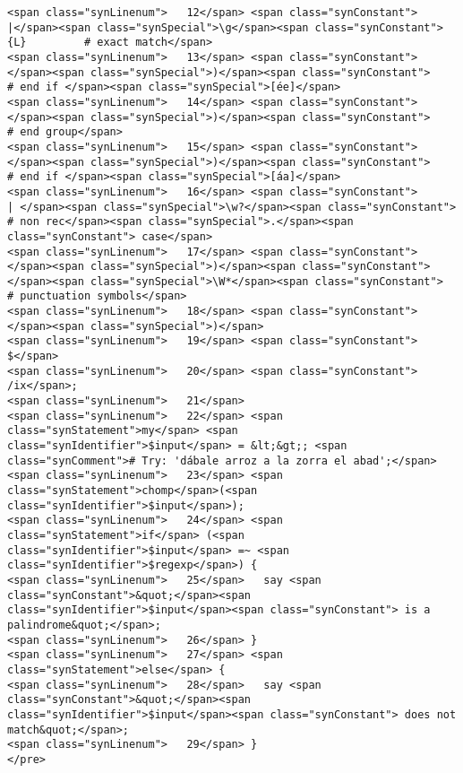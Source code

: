 \begin{verbatim}
<span class="synLinenum">   12</span> <span class="synConstant">                                            |</span><span class="synSpecial">\g</span><span class="synConstant">{L}         # exact match</span>
<span class="synLinenum">   13</span> <span class="synConstant">                                      </span><span class="synSpecial">)</span><span class="synConstant">                    # end if </span><span class="synSpecial">[ée]</span>
<span class="synLinenum">   14</span> <span class="synConstant">                                   </span><span class="synSpecial">)</span><span class="synConstant">                       # end group</span>
<span class="synLinenum">   15</span> <span class="synConstant">                            </span><span class="synSpecial">)</span><span class="synConstant">                              # end if </span><span class="synSpecial">[áa]</span>
<span class="synLinenum">   16</span> <span class="synConstant">                          | </span><span class="synSpecial">\w?</span><span class="synConstant">                            # non rec</span><span class="synSpecial">.</span><span class="synConstant"> case</span>
<span class="synLinenum">   17</span> <span class="synConstant">                      </span><span class="synSpecial">)</span><span class="synConstant"> </span><span class="synSpecial">\W*</span><span class="synConstant">                                # punctuation symbols</span>
<span class="synLinenum">   18</span> <span class="synConstant">                  </span><span class="synSpecial">)</span>
<span class="synLinenum">   19</span> <span class="synConstant">                $</span>
<span class="synLinenum">   20</span> <span class="synConstant">               /ix</span>;
<span class="synLinenum">   21</span> 
<span class="synLinenum">   22</span> <span class="synStatement">my</span> <span class="synIdentifier">$input</span> = &lt;&gt;; <span class="synComment"># Try: 'dábale arroz a la zorra el abad';</span>
<span class="synLinenum">   23</span> <span class="synStatement">chomp</span>(<span class="synIdentifier">$input</span>);
<span class="synLinenum">   24</span> <span class="synStatement">if</span> (<span class="synIdentifier">$input</span> =~ <span class="synIdentifier">$regexp</span>) {
<span class="synLinenum">   25</span>   say <span class="synConstant">&quot;</span><span class="synIdentifier">$input</span><span class="synConstant"> is a palindrome&quot;</span>;
<span class="synLinenum">   26</span> }
<span class="synLinenum">   27</span> <span class="synStatement">else</span> {
<span class="synLinenum">   28</span>   say <span class="synConstant">&quot;</span><span class="synIdentifier">$input</span><span class="synConstant"> does not match&quot;</span>;
<span class="synLinenum">   29</span> }
</pre>

\end{verbatim}


